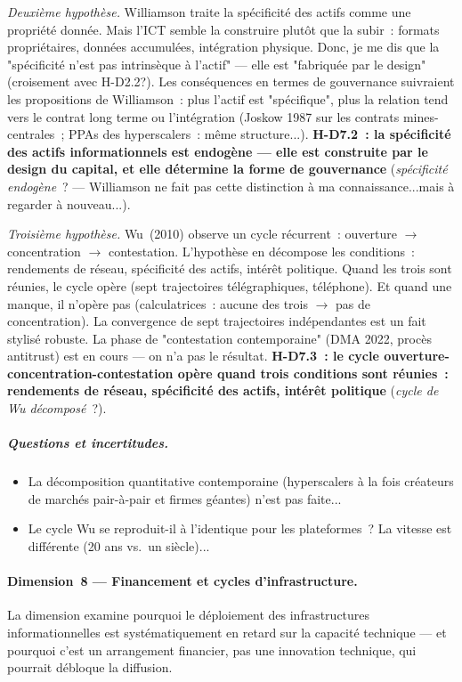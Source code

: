 \emph{Deuxi\`eme hypoth\`ese.} Williamson traite la sp\'ecificit\'e des actifs comme une propri\'et\'e donn\'ee. Mais l'ICT semble la construire plut\^ot que la subir~: formats propri\'etaires, donn\'ees accumul\'ees, int\'egration physique. Donc, je me dis que la "sp\'ecificit\'e n'est pas intrins\`eque \`a l'actif" --- elle est "fabriqu\'ee par le design" (croisement avec H-D2.2?). Les cons\'equences en termes de gouvernance suivraient les propositions de Williamson~: plus l'actif est "sp\'ecifique", plus la relation tend vers le contrat long terme ou l'int\'egration (Joskow 1987 sur les contrats mines-centrales~; PPAs des hyperscalers~: m\^eme structure...). \textbf{H-D7.2~: la sp\'ecificit\'e des actifs informationnels est endog\`ene --- elle est construite par le design du capital, et elle d\'etermine la forme de gouvernance} (\emph{sp\'ecificit\'e endog\`ene}~? --- Williamson ne fait pas cette distinction à ma connaissance...mais à regarder à nouveau...).

\emph{Troisi\`eme hypoth\`ese.} Wu~(2010) observe un cycle r\'ecurrent~: ouverture $\to$ concentration $\to$ contestation. L'hypoth\`ese en d\'ecompose les conditions~: rendements de r\'eseau, sp\'ecificit\'e des actifs, int\'er\^et politique. Quand les trois sont r\'eunies, le cycle op\`ere (sept trajectoires t\'el\'egraphiques, t\'el\'ephone). Et quand une manque, il n'op\`ere pas (calculatrices~: aucune des trois $\to$ pas de concentration). La convergence de sept trajectoires ind\'ependantes est un fait stylis\'e robuste. La phase de "contestation contemporaine" (DMA 2022, proc\`es antitrust) est en cours --- on n'a pas le r\'esultat. \textbf{H-D7.3~: le cycle ouverture-concentration-contestation op\`ere quand trois conditions sont r\'eunies~: rendements de r\'eseau, sp\'ecificit\'e des actifs, int\'er\^et politique} (\emph{cycle de Wu d\'ecompos\'e}~?).

\subparagraph{Questions et incertitudes.}
\begin{itemize}
\item La d\'ecomposition quantitative contemporaine (hyperscalers \`a la fois cr\'eateurs de march\'es pair-\`a-pair et firmes g\'eantes) n'est pas faite...
\item Le cycle Wu se reproduit-il \`a l'identique pour les plateformes~? La vitesse est diff\'erente (20 ans vs.\ un si\`ecle)...
\end{itemize}


\paragraph{Dimension~8 --- Financement et cycles d'infrastructure.}
La dimension examine pourquoi le d\'eploiement des infrastructures informationnelles est syst\'ematiquement en retard sur la capacit\'e technique --- et pourquoi c'est un arrangement financier, pas une innovation technique, qui pourrait d\'ebloque la diffusion.

